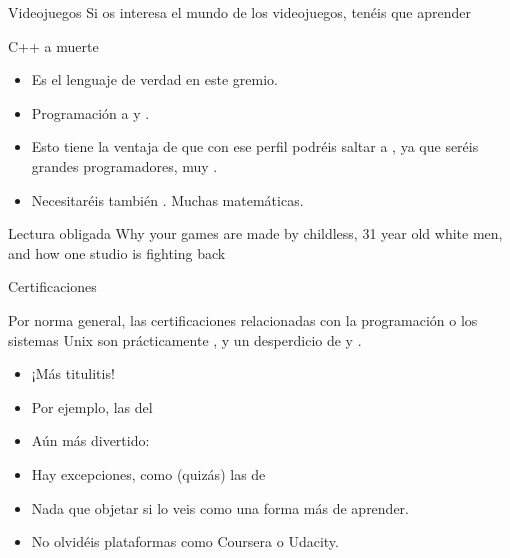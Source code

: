 \documentclass[14pt]{beamer}
\newcommand{\WebLink}[2]{
  \href{#1}{\structure{\PointingHand~\color{sail-green}{#2}}}
}
\begin{document}
\begin{frame}{Videojuegos}
  \centering \small
  Si os interesa el mundo de los videojuegos, tenéis que aprender

  \begin{alertblock}{}
    \centering \LARGE C++ a muerte
  \end{alertblock}

  \begin{itemize} \small
    \itemsep0em
    \item Es el lenguaje de verdad en este gremio.
    \item Programación a  y .
    \item Esto tiene la ventaja de que con ese perfil podréis saltar
      a , ya que seréis grandes
      programadores, muy .
    \item Necesitaréis también . Muchas matemáticas.
  \end{itemize}

  \begin{block}{\centering \small Lectura obligada}
    \centering \small Why your games are made by childless, 31 year
    old white men, and how one studio is fighting back
    \WebLink{https://web.archive.org/web/20131211193933/http://penny-arcade.com/report/article/why-your-games-are-made-by-childless-31-year-old-white-men-and-how-one-stud}
            {Internet Archive}
  \end{block}
\end{frame}

\begin{frame}{Certificaciones}

  \begin{block}{}
    \centering
    Por norma general, las certificaciones relacionadas con la
    programación o los sistemas Unix son prácticamente
    , y un desperdicio de  y
    .
  \end{block}

  \begin{itemize}
    \item ¡Más titulitis!
    \item Por ejemplo, las del
      \WebLink{https://www.lpi.org/linux-certifications}
              {Linux Professional Institute}
    \item Aún más divertido:
      \WebLink{http://www.oreillyschool.com/certificate-programs/python-programming/}
              {Python Programming Certificate}
    \item Hay excepciones, como (quizás) las de
      \WebLink{http://cisco.com/web/learning/certifications/entry/ccent/index.html}
              {Cisco}
    \item Nada que objetar si lo veis como una forma más de aprender.
    \item No olvidéis plataformas como Coursera o Udacity.
  \end{itemize}

\end{frame}
\end{document}
